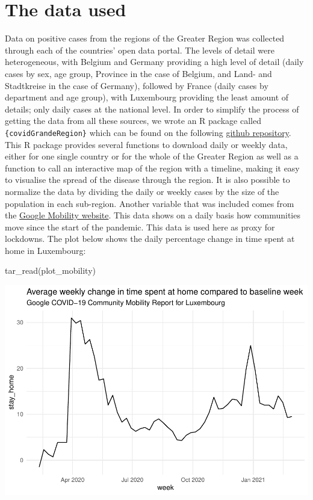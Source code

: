 \documentclass{article}
\newenvironment{Shaded}{\begin{snugshade}}{\end{snugshade}}
\newcommand{\FunctionTok}[1]{\textcolor[rgb]{0.00,0.00,0.00}{#1}}
\newcommand{\NormalTok}[1]{#1}
\begin{document}
\hypertarget{the-data-used}{%
\section{The data used}\label{the-data-used}}

Data on positive cases from the regions of the Greater Region was
collected through each of the countries' open data portal. The levels of
detail were heterogeneous, with Belgium and Germany providing a high
level of detail (daily cases by sex, age group, Province in the case of
Belgium, and Land- and Stadtkreise in the case of Germany), followed by
France (daily cases by department and age group), with Luxembourg
providing the least amount of details; only daily cases at the national
level. In order to simplify the process of getting the data from all
these sources, we wrote an R package called
\texttt{\{covidGrandeRegion\}} which can be found on the following
\href{https://github.com/b-rodrigues/covidGrandeRegion}{github
repository}. This R package provides several functions to download daily
or weekly data, either for one single country or for the whole of the
Greater Region as well as a function to call an interactive map of the
region with a timeline, making it easy to visualise the spread of the
disease through the region. It is also possible to normalize the data by
dividing the daily or weekly cases by the size of the population in each
sub-region. Another variable that was included comes from the
\href{https://www.google.com/covid19/mobility/}{Google Mobility
website}. This data shows on a daily basis how communities move since
the start of the pandemic. This data is used here as proxy for
lockdowns. The plot below shows the daily percentage change in time
spent at home in Luxembourg:

\begin{Shaded}
\begin{Highlighting}[]
\FunctionTok{tar\_read}\NormalTok{(plot\_mobility)}
\end{Highlighting}
\end{Shaded}

\includegraphics{paper_files/figure-latex/unnamed-chunk-3-1.pdf}
\end{document}
